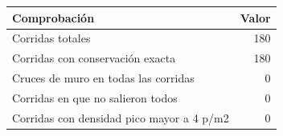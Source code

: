 \begin{tabular}{lr}
\toprule
Comprobación & Valor \\
\midrule
Corridas totales & 180 \\
Corridas con conservación exacta & 180 \\
Cruces de muro en todas las corridas & 0 \\
Corridas en que no salieron todos & 0 \\
Corridas con densidad pico mayor a 4 p/m2 & 0 \\
\bottomrule
\end{tabular}
